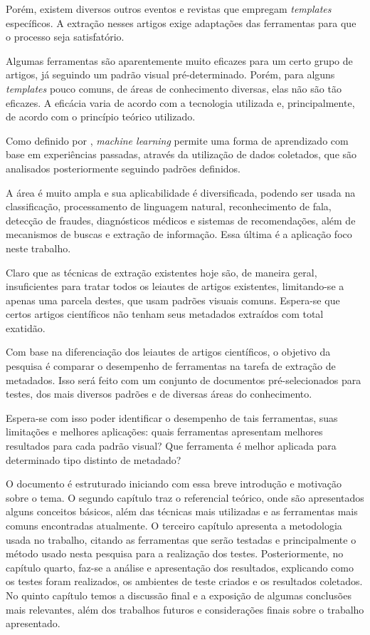 Porém, existem diversos outros eventos e revistas que empregam \textit{templates} específicos. A extração nesses artigos exige adaptações das ferramentas para que o processo seja satisfatório. 

Algumas ferramentas são aparentemente muito eficazes para um certo grupo de artigos, já seguindo um padrão visual pré-determinado. Porém, para alguns \textit{templates} pouco comuns, de áreas de conhecimento diversas, elas não são tão eficazes. A eficácia varia de acordo com a tecnologia utilizada e, principalmente, de acordo com o princípio teórico utilizado.

Como definido por \cite{foundations-machine-learning}, \textit{machine learning} permite uma forma de aprendizado com base em experiências passadas, através da utilização de dados coletados, que são analisados posteriormente seguindo padrões definidos.

A área é muito ampla e sua aplicabilidade é diversificada, podendo ser usada na classificação, processamento de linguagem natural, reconhecimento de fala, detecção de fraudes, diagnósticos médicos e sistemas de recomendações, além de mecanismos de buscas e extração de informação. Essa última é a aplicação foco neste trabalho.

Claro que as técnicas de extração existentes hoje são, de maneira geral, insuficientes para tratar todos os leiautes de artigos existentes, limitando-se a apenas uma parcela destes, que usam padrões visuais comuns. Espera-se que certos artigos científicos não tenham seus metadados extraídos com total exatidão.

Com base na diferenciação dos leiautes de artigos científicos, o objetivo da pesquisa é comparar o desempenho de ferramentas na tarefa de extração de metadados. Isso será feito com um conjunto de documentos pré-selecionados para testes, dos mais diversos padrões e de diversas áreas do conhecimento.

Espera-se com isso poder identificar o desempenho de tais ferramentas, suas limitações e melhores aplicações: quais ferramentas apresentam melhores resultados para cada padrão visual? Que ferramenta é melhor aplicada para determinado tipo distinto de metadado?

O documento é estruturado iniciando com essa breve introdução e motivação sobre o tema. O segundo capítulo traz o referencial teórico, onde são apresentados alguns conceitos básicos, além das técnicas mais utilizadas e as ferramentas mais comuns encontradas atualmente. O terceiro capítulo apresenta a metodologia usada no trabalho, citando as ferramentas que serão testadas e principalmente o método usado nesta pesquisa para a realização dos testes. Posteriormente, no capítulo quarto, faz-se a análise e apresentação dos resultados, explicando como os testes foram realizados, os ambientes de teste criados e os resultados coletados. No quinto capítulo temos a discussão final e a exposição de algumas conclusões mais relevantes, além dos trabalhos futuros e considerações finais sobre o trabalho apresentado.


